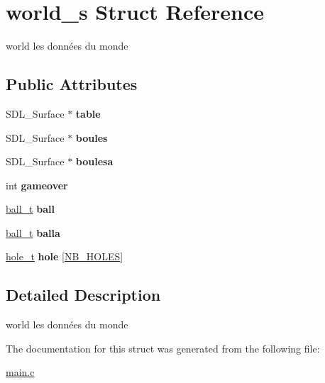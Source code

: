 \hypertarget{structworld__s}{\section{world\-\_\-s Struct Reference}
\label{structworld__s}
}


world les données du monde  


\subsection*{Public Attributes}
\begin{DoxyCompactItemize}
\item 
\hypertarget{structworld__s_aa9646dfaffa5e0b1cbf60d9eae003913}{S\-D\-L\-\_\-\-Surface $\ast$ {\bfseries table}}\label{structworld__s_aa9646dfaffa5e0b1cbf60d9eae003913}

\item 
\hypertarget{structworld__s_add1490be2b8a68c98a84acdfdcc8c09e}{S\-D\-L\-\_\-\-Surface $\ast$ {\bfseries boules}}\label{structworld__s_add1490be2b8a68c98a84acdfdcc8c09e}

\item 
\hypertarget{structworld__s_adb74c257758812f9d7830e4bcd98e6f6}{S\-D\-L\-\_\-\-Surface $\ast$ {\bfseries boulesa}}\label{structworld__s_adb74c257758812f9d7830e4bcd98e6f6}

\item 
\hypertarget{structworld__s_a693aa82d082fe3467969094559b9bc0f}{int {\bfseries gameover}}\label{structworld__s_a693aa82d082fe3467969094559b9bc0f}

\item 
\hypertarget{structworld__s_a6089e88edc1e689bdc177d6867d1310f}{\hyperlink{structball__s}{ball\-\_\-t} {\bfseries ball}}\label{structworld__s_a6089e88edc1e689bdc177d6867d1310f}

\item 
\hypertarget{structworld__s_ac5e9581cbd60a9a9455af0d48a8ed7f5}{\hyperlink{structball__s}{ball\-\_\-t} {\bfseries balla}}\label{structworld__s_ac5e9581cbd60a9a9455af0d48a8ed7f5}

\item 
\hypertarget{structworld__s_a3375c7fd4eba065fdc9f81e7ef1d7eb9}{\hyperlink{structhole__s}{hole\-\_\-t} {\bfseries hole} \mbox{[}\hyperlink{main_8c_a91c8c5c1b1d20b0179a711bf6c43160f}{N\-B\-\_\-\-H\-O\-L\-E\-S}\mbox{]}}\label{structworld__s_a3375c7fd4eba065fdc9f81e7ef1d7eb9}

\end{DoxyCompactItemize}


\subsection{Detailed Description}
world les données du monde 

The documentation for this struct was generated from the following file\-:\begin{DoxyCompactItemize}
\item 
\hyperlink{main_8c}{main.\-c}\end{DoxyCompactItemize}
